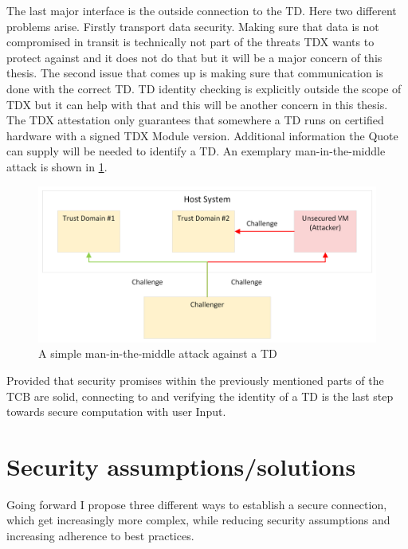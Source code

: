 The last major interface is the outside connection to the TD. Here two different problems arise. Firstly transport data security. Making sure that data is not compromised in transit is technically not part of the threats TDX wants to protect against and it does not do that but it will be a major concern of this thesis. The second issue that comes up is making sure that communication is done with the correct TD. TD identity checking is explicitly outside the scope of TDX but it can help with that and this will be another concern in this thesis. The TDX attestation only guarantees that somewhere a TD runs on certified hardware with a signed TDX Module version. Additional information the Quote can supply will be needed to identify a TD. An exemplary man-in-the-middle attack is shown in \ref{fig:man_in_the_middle}.
\begin{figure}
   \centering
       \includegraphics[width=.75\textwidth]{figures/Man-In-The-Middle.png} 
 \caption{A simple man-in-the-middle attack against a TD}
 \label{fig:man_in_the_middle}
\end{figure}
Provided that security promises within the previously mentioned parts of the TCB are solid, connecting to and verifying the identity of a \Gls{TD} is the last step towards secure computation with user Input.

\section{Security assumptions/solutions} 

Going forward I propose three different ways to establish a secure connection, which get increasingly more complex, while reducing security assumptions and increasing adherence to best practices.


